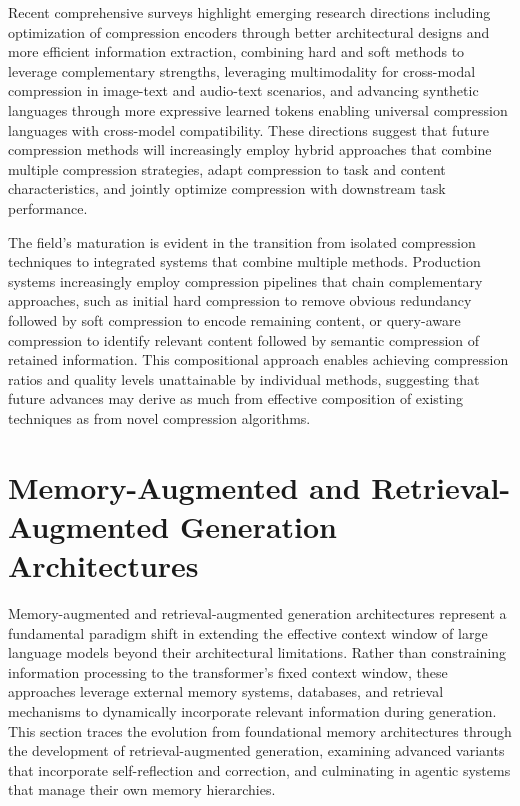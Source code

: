 \documentclass[11pt,letterpaper]{article}
\begin{document}
Recent comprehensive surveys \cite{li2025prompt} highlight emerging research directions including optimization of compression encoders through better architectural designs and more efficient information extraction, combining hard and soft methods to leverage complementary strengths, leveraging multimodality for cross-modal compression in image-text and audio-text scenarios, and advancing synthetic languages through more expressive learned tokens enabling universal compression languages with cross-model compatibility. These directions suggest that future compression methods will increasingly employ hybrid approaches that combine multiple compression strategies, adapt compression to task and content characteristics, and jointly optimize compression with downstream task performance.

The field's maturation is evident in the transition from isolated compression techniques to integrated systems that combine multiple methods. Production systems increasingly employ compression pipelines that chain complementary approaches, such as initial hard compression to remove obvious redundancy followed by soft compression to encode remaining content, or query-aware compression to identify relevant content followed by semantic compression of retained information. This compositional approach enables achieving compression ratios and quality levels unattainable by individual methods, suggesting that future advances may derive as much from effective composition of existing techniques as from novel compression algorithms.


\section{Memory-Augmented and Retrieval-Augmented Generation Architectures}
\label{sec:memoryaugmented}

Memory-augmented and retrieval-augmented generation architectures represent a fundamental paradigm shift in extending the effective context window of large language models beyond their architectural limitations. Rather than constraining information processing to the transformer's fixed context window, these approaches leverage external memory systems, databases, and retrieval mechanisms to dynamically incorporate relevant information during generation. This section traces the evolution from foundational memory architectures through the development of retrieval-augmented generation, examining advanced variants that incorporate self-reflection and correction, and culminating in agentic systems that manage their own memory hierarchies.
\end{document}
